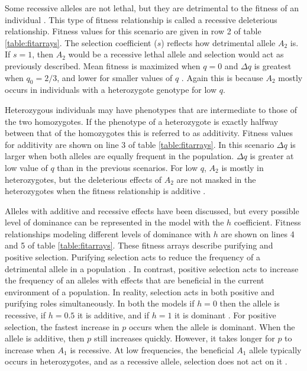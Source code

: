 Some recessive alleles are not lethal, but they are detrimental to the fitness of an individual \parencite{Charlesworth2009a,Charlesworth2010}.
This type of fitness relationship is called a recessive deleterious relationship. 
Fitness values for this scenario are given in row 2 of table \ref{table:fitarrays}.
The selection coefficient ($s$) reflects how detrimental allele $A_2$ is. 
If $s = 1$, then $A_2$ would be a recessive lethal allele and selection would act as previously described.
Mean fitness is maximized when $q = 0$ and $\Delta q$ is greatest when $q_0=2/3$, and lower for smaller values of $q$ \parencite{Hedrick2010}.
Again this is because $A_2$ mostly occurs in individuals with a heterozygote genotype for low $q$.

Heterozygous individuals may have phenotypes that are intermediate to those of the two homozygotes.
If the phenotype of a heterozygote is exactly halfway between that of the homozygotes this is referred to as additivity.
Fitness values for additivity are shown on line 3 of table \ref{table:fitarrays}.
In this scenario $\Delta q$ is larger when both alleles are equally frequent in the population.
$\Delta q$ is greater at low value of $q$ than in the previous scenarios.
For low $q$, $A_2$ is mostly in heterozygotes, but the deleterious effects of $A_2$ are not masked in the heterozygotes when the fitness relationship is additive \parencite{Charlesworth2010,Hedrick2010}.

Alleles with additive and recessive effects have been discussed, but every possible level of dominance can be represented in the model with the $h$ coefficient.
Fitness relationships modeling different levels of dominance with $h$ are shown on lines 4 and 5 of table \ref{table:fitarrays}.
These fitness arrays describe purifying and positive selection.
Purifying selection acts to reduce the frequency of a detrimental allele in a population \parencite{Hedrick2010}.
In contrast, positive selection acts to increase the frequency of an alleles with effects that are beneficial in the current environment of a population.
In reality, selection acts in both positive and purifying roles simultaneously.
In both the models if $h = 0$ then the allele is recessive, if $h = 0.5$ it is additive, and if $h=1$ it is dominant \parencite{Charlesworth2010}. 
For positive selection, the fastest increase in $p$ occurs when the allele is dominant.
When the allele is additive, then $p$ still increases quickly.
However, it takes longer for $p$ to increase when $A_1$ is recessive.
At low frequencies, the beneficial $A_1$ allele typically occurs in heterozygotes, and as a recessive allele, selection does not act on it \parencite{Hedrick2010}.

